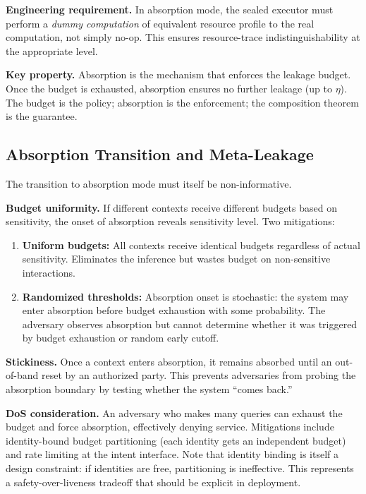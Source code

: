 \documentclass[11pt,a4paper]{article}
\begin{document}
\textbf{Engineering requirement.} In absorption mode, the sealed executor must perform a \textit{dummy computation} of equivalent resource profile to the real computation, not simply no-op. This ensures resource-trace indistinguishability at the appropriate level.

\textbf{Key property.} Absorption is the mechanism that enforces the leakage budget. Once the budget is exhausted, absorption ensures no further leakage (up to $\eta$). The budget is the policy; absorption is the enforcement; the composition theorem is the guarantee.

\subsection{Absorption Transition and Meta-Leakage}\label{sec:transition}

The transition to absorption mode must itself be non-informative.

\textbf{Budget uniformity.} If different contexts receive different budgets based on sensitivity, the onset of absorption reveals sensitivity level. Two mitigations:

\begin{enumerate}
  \item \textbf{Uniform budgets:} All contexts receive identical budgets regardless of actual sensitivity. Eliminates the inference but wastes budget on non-sensitive interactions.
  \item \textbf{Randomized thresholds:} Absorption onset is stochastic: the system may enter absorption before budget exhaustion with some probability. The adversary observes absorption but cannot determine whether it was triggered by budget exhaustion or random early cutoff.
\end{enumerate}

\textbf{Stickiness.} Once a context enters absorption, it remains absorbed until an out-of-band reset by an authorized party. This prevents adversaries from probing the absorption boundary by testing whether the system ``comes back.''

\textbf{DoS consideration.} An adversary who makes many queries can exhaust the budget and force absorption, effectively denying service. Mitigations include identity-bound budget partitioning (each identity gets an independent budget) and rate limiting at the intent interface. Note that identity binding is itself a design constraint: if identities are free, partitioning is ineffective. This represents a safety-over-liveness tradeoff that should be explicit in deployment.
\end{document}
